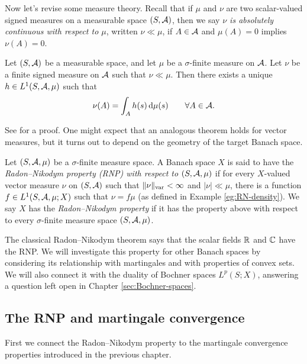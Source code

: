 Now let's revise some measure theory.
Recall that if $\mu$ and $\nu$ are two scalar-valued signed measures on a measurable space $(S,\mathcal{A})$, then we say \emph{$\nu$ is absolutely continuous with respect to $\mu$}, written $\nu \ll \mu$, if $A \in \mathcal{A}$ and $\mu(A) = 0$ implies $\nu(A) = 0$.

\begin{thm}
  Let $(S,\mathcal{A})$ be a measurable space, and let $\mu$ be a $\sigma$-finite measure on $\mathcal{A}$.
  Let $\nu$ be a finite signed measure on $\mathcal{A}$ such that $\nu \ll \mu$.
  Then there exists a unique $h \in L^1(S,\mathcal{A},\mu)$ such that
  \begin{equation*}
    \nu(A) = \int_{A} h(s) \, \mathrm{d}\mu(s) \qquad \forall A \in \mathcal{A}.
  \end{equation*}
\end{thm}

See \cite[Theorem 5.5.4]{rD04} for a proof.
One might expect that an analogous theorem holds for vector measures, but it turns out to depend on the geometry of the target Banach space.

\begin{defn}
  Let $(S,\mathcal{A},\mu)$ be a $\sigma$-finite measure space.
  A Banach space $X$ is said to have the \emph{Radon--Nikodym property (RNP) with respect to $(S,\mathcal{A},\mu)$} if for every $X$-valued vector measure $\nu$ on $(S,\mathcal{A})$ such that $\|\nu\|_{\mathrm{var}} < \infty$ and $|\nu| \ll \mu$, there is a function $f \in L^1(S,\mathcal{A},\mu;X)$ such that $\nu = f\mu$ (as defined in Example \ref{eg:RN-density}).
  We say $X$ has the \emph{Radon--Nikodym property} if it has the property above with respect to every $\sigma$-finite measure space $(S,\mathcal{A},\mu)$.
\end{defn}

The classical Radon--Nikodym theorem says that the scalar fields $\mathbb{R}$ and $\mathbb{C}$ have the RNP.
We will investigate this property for other Banach spaces by considering its relationship with martingales and with properties of convex sets.
We will also connect it with the duality of Bochner spaces $L^p(S;X)$, answering a question left open in Chapter \ref{sec:Bochner-spaces}.

\subsection{The RNP and martingale convergence}

First we connect the Radon--Nikodym property to the martingale convergence properties introduced in the previous chapter.

